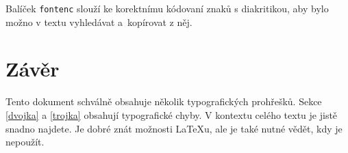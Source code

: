 \documentclass[10pt, a4paper, twocolumn]{article}
\begin{document}
Balíček \verb|fontenc| slouží ke korektnímu kódovaní znaků s diakritikou, aby bylo možno v textu vyhledávat a~kopí\-rovat z něj.

\section{Závěr}
\label{petka}
Tento dokument schválně obsahuje několik typografických prohřešků.
Sekce \ref{dvojka} a \ref{trojka} obsahují typografické chyby.
V kontextu celého textu je jistě snadno najdete.
Je dobré znát možnosti \LaTeX u, ale je také nutné vědět, kdy je nepoužít.
\end{document}
